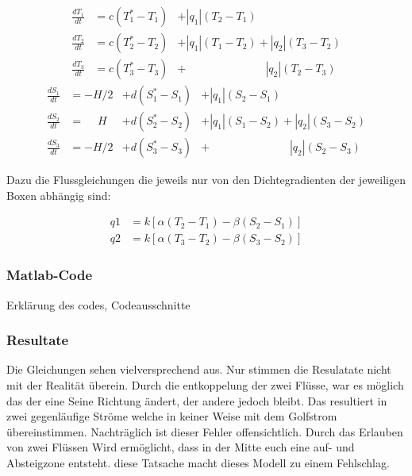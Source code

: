 \begin{equation}
\begin{aligned}
\frac{dT_1}{dt} &= c(T_1^*-T_1)&+|q_1|(T_2-T_1)\phantom{+|q_2|(T_3-T_2)}
\\
\frac{dT_2}{dt} &= c(T_2^*-T_2)&+|q_1|(T_1-T_2)+|q_2|(T_3-T_2)
\\
\frac{dT_3}{dt} &= c(T_3^*-T_3)&+ \phantom{+|q_1|(T_1-T_2)}|q_2|(T_2-T_3)
\end{aligned}
\end{equation}
\begin{equation}
\begin{aligned}
\frac{dS_1}{dt} &= -H/2 &+ d(S_1^*-S_1)&+|q_1|(S_2-S_1)\phantom{+|q_2|(S_3-S_2)}
\\
\frac{dS_2}{dt} &= \phantom{-}H &+ d(S_2^*-S_2)&+|q_1|(S_1-S_2)+|q_2|(S_3-S_2)	
\\
\frac{dS_3}{dt} &= -H/2 &+d(S_3^*-S_3)&+ \phantom{+|q_1|(S_1-S_2)}|q_2|(S_2-S_3)
\end{aligned}
\end{equation}	

Dazu die Flussgleichungen die jeweils nur von den Dichtegradienten der jeweiligen Boxen abhängig sind:

\begin{equation}
\begin{aligned}
 q1 &= k[\alpha(T_2-T_1)-\beta(S_2-S_1)] 
 \\
 q2 &= k[\alpha(T_3-T_2)-\beta(S_3-S_2)]
\end{aligned}
\end{equation}

\subsubsection{Matlab-Code}

Erklärung des codes, Codeausschnitte

\subsubsection{Resultate}


Die Gleichungen sehen vielversprechend aus. Nur stimmen die Resulatate nicht mit der Realität überein.
Durch die entkoppelung der zwei Flüsse, war es möglich das der eine Seine Richtung ändert, der andere jedoch bleibt. Das resultiert in zwei gegenläufige Ströme welche in keiner Weise mit dem Golfstrom übereinstimmen.
Nachträglich ist dieser Fehler offensichtlich. Durch das Erlauben von zwei Flüssen Wird ermöglicht, dass in der Mitte euch eine auf- und Absteigzone entsteht.
diese Tatsache macht dieses Modell zu einem Fehlschlag.


